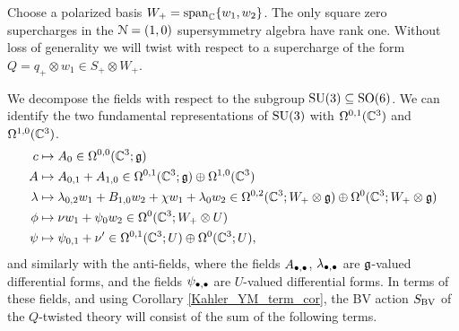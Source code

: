 \documentclass[10pt, oneside]{article}
\begin{document}
Choose a polarized basis $W_+ = {\rm span}_{\mathbb C}\{w_1, w_2\}$.
The only square zero supercharges in the $\mathcal{N}=(1,0)$ supersymmetry algebra have rank one.  Without loss of generality we will twist with respect to a supercharge of the form $Q = q_+ \otimes w_1 \in S_+ \otimes W_+$. 

We decompose the fields with respect to the subgroup $\mathrm{SU}(3) \subseteq \mathrm{SO}(6)$.  We can identify the two fundamental representations of $\mathrm{SU}(3)$ with $\Omega^{0,1}(\mathbb C^3)$ and $\Omega^{1,0}(\mathbb C^3)$. 
\begin{align*}
c & \mapsto A_0 \in \Omega^{0,0}(\mathbb C^3 ; \mathfrak g) \\
A & \mapsto A_{0,1} + A_{1,0} \in \Omega^{0,1}(\mathbb C^3 ; \mathfrak g) \oplus \Omega^{1,0}(\mathbb C^3) \\
\lambda & \mapsto \lambda_{0,2} w_1 + {B}_{1,0}w_2 + \chi w_1 + \lambda_0 w_2 \in \Omega^{0,2}(\mathbb C^3 ; W_+ \otimes \mathfrak g) \oplus \Omega^{0}(\mathbb C^3 ; W_+ \otimes \mathfrak g) \\
\phi & \mapsto \nu w_1 + \psi_0 w_2 \in \Omega^0(\mathbb C^3; W_+ \otimes U) \\
\psi & \mapsto \psi_{0,1} + \nu' \in \Omega^{0,1}(\mathbb C^3; U) \oplus \Omega^0(\mathbb C^3; U),
\end{align*} 
and similarly with the anti-fields, where the fields $A_{\bullet, \bullet}$, $\lambda_{\bullet,\bullet}$ are $\mathfrak g$-valued differential forms, and the fields $\psi_{\bullet,\bullet}$ are $U$-valued differential forms.  In terms of these fields, and using Corollary \ref{Kahler_YM_term_cor}, the BV action $S_{\mathrm{BV}}$ of the $Q$-twisted theory will consist of the sum of the following terms.
\end{document}
